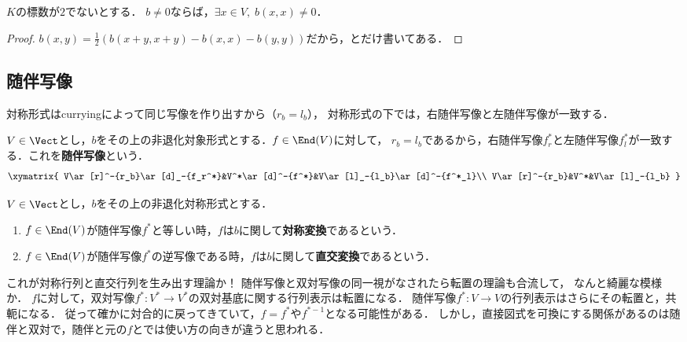 \documentclass[uplatex, dvipdfmx]{jsreport}
\begin{document}
\begin{lemma}
    $K$の標数が$2$でないとする．
    $b\ne 0$ならば，$\exists x\in V,\;b(x,x)\ne 0$．
\end{lemma}
\begin{proof}
    $b(x,y)=\frac{1}{2}(b(x+y,x+y)-b(x,x)-b(y,y))$だから，とだけ書いてある．
\end{proof}

\subsection{随伴写像}

\begin{tcolorbox}[colframe=ForestGreen, colback=ForestGreen!10!white, breakable]
    対称形式はcurryingによって同じ写像を作り出すから（$r_b=l_b$），
    対称形式の下では，右随伴写像と左随伴写像が一致する．
\end{tcolorbox}

\begin{definition}
    $V\in\Vect$とし，$b$をその上の非退化対象形式とする．$f\in\End(V)$に対して，
    $r_b=l_b$であるから，右随伴写像$f^*_r$と左随伴写像$f^*_l$が一致する．これを\textbf{随伴写像}という．
    \[\xymatrix{
        V\ar[r]^-{r_b}\ar[d]_-{f_r^*}&V^*\ar[d]^-{f^*}&V\ar[l]_-{l_b}\ar[d]^-{f^*_l}\\
        V\ar[r]^-{r_b}&V^*&V\ar[l]_-{l_b}
    }\]
\end{definition}

\begin{definition}
    $V\in\Vect$とし，$b$をその上の非退化対称形式とする．
    \begin{enumerate}
        \item $f\in\End(V)$が随伴写像$f^*$と等しい時，$f$は$b$に関して\textbf{対称変換}であるという．
        \item $f\in\End(V)$が随伴写像$f^*$の逆写像である時，$f$は$b$に関して\textbf{直交変換}であるという．
    \end{enumerate}
\end{definition}
\begin{remark}
    これが対称行列と直交行列を生み出す理論か！
    随伴写像と双対写像の同一視がなされたら転置の理論も合流して，
    なんと綺麗な模様か．
    $f$に対して，双対写像$f^*:V^*\to V^*$の双対基底に関する行列表示は転置になる．
    随伴写像$f^*:V\to V$の行列表示はさらにその転置と，共軛になる．
    従って確かに対合的に戻ってきていて，$f=f^*$や$f^{*-1}$となる可能性がある．
    しかし，直接図式を可換にする関係があるのは随伴と双対で，随伴と元の$f$とでは使い方の向きが違うと思われる．
\end{remark}
\end{document}
